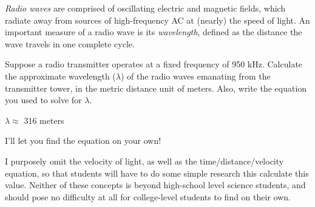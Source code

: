 

{\it Radio waves} are comprised of oscillating electric and magnetic fields, which radiate away from sources of high-frequency AC at (nearly) the speed of light.  An important measure of a radio wave is its {\it wavelength}, defined as the distance the wave travels in one complete cycle.

Suppose a radio transmitter operates at a fixed frequency of 950 kHz.  Calculate the approximate wavelength ($\lambda$) of the radio waves emanating from the transmitter tower, in the metric distance unit of meters.  Also, write the equation you used to solve for $\lambda$.







$\lambda \approx$ 316 meters

\vskip 10pt

I'll let you find the equation on your own!







I purposely omit the velocity of light, as well as the time/distance/velocity equation, so that students will have to do some simple research this calculate this value.  Neither of these concepts is beyond high-school level science students, and should pose no difficulty at all for college-level students to find on their own.




